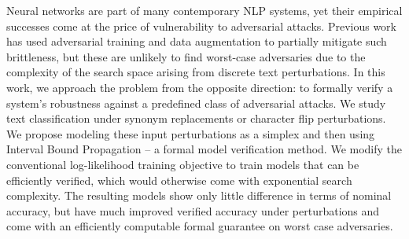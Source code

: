 Neural networks are part of many contemporary NLP systems, yet their empirical successes come at the price of vulnerability to adversarial attacks. Previous work has used adversarial training and data augmentation to partially mitigate such brittleness, but these are unlikely to find worst-case adversaries due to the complexity of the search space arising from discrete text perturbations. In this work, we approach the problem from the opposite direction: to formally verify a system's robustness against a predefined class of adversarial attacks. We study text classification under synonym replacements or character flip perturbations. We propose modeling these input perturbations as a simplex and then using Interval Bound Propagation -- a formal model verification method. We modify the conventional log-likelihood training objective to train models that can be efficiently verified, which would otherwise come with exponential search complexity. The resulting models show only little difference in terms of nominal accuracy, but have much improved verified accuracy under perturbations and come with an efficiently computable formal guarantee on worst case adversaries.